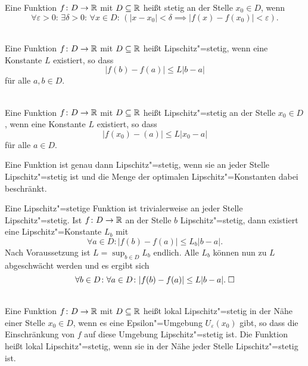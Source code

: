 \begin{Definition}\label{cont}
Eine Funktion $f\colon D\to\mathbb R$ mit $D\subseteq\mathbb R$ heißt stetig an der
Stelle $x_0\in D$, wenn
\[\forall \varepsilon{>}0\colon\,\exists \delta{>}0\colon\,\forall x{\in}D\colon\,
(|x-x_0|<\delta\implies |f(x)-f(x_0)|<\varepsilon).\]
\end{Definition}

\begin{Definition}\mbox{}\\
Eine Funktion $f\colon D\to\mathbb R$ mit $D\subseteq\mathbb R$ heißt
Lipschitz"=stetig, wenn eine Konstante $L$ existiert, so dass
\[|f(b)-f(a)|\le L|b-a|\]
für alle $a,b\in D$.
\end{Definition}

\begin{Definition}%
\label{Lipschitz-cont-at}\mbox{}\\
Eine Funktion $f\colon D\to\mathbb R$ mit $D\subseteq\mathbb R$ heißt
Lipschitz"=stetig an der Stelle $x_0\in D$, wenn eine Konstante $L$
existiert, so dass
\[|f(x_0)-(a)|\le L|x_0-a|\]
für alle $a\in D$.
\end{Definition}

\begin{Korollar}
Eine Funktion ist genau dann Lipschitz"=stetig, wenn sie an jeder
Stelle Lipschitz"=stetig ist und die Menge der optimalen
Lipschitz"=Konstanten dabei beschränkt.
\end{Korollar}
\begin{Beweis}
Eine Lipschitz"=stetige Funktion ist trivialerweise an jeder Stelle
Lipschitz"=stetig. Ist $f\colon D\to\mathbb R$ an der Stelle $b$ Lipschitz"=stetig,
dann existiert eine Lipschitz"=Konstante $L_b$ mit%
\[\forall a\in D\colon |f(b)-f(a)|\le L_b |b-a|.\]
Nach Voraussetzung ist $L=\sup_{b\in D} L_b$ endlich. Alle $L_b$ können
nun zu $L$ abgeschwächt werden und es ergibt sich%
\[\forall b\in D\colon\forall a\in D\colon |f(b)-f(a)|\le L|b-a|.\;\square\]
\end{Beweis}


\begin{Definition}\mbox{}\\
Eine Funktion $f\colon D\to\mathbb R$ mit $D\subseteq\mathbb R$ heißt lokal
Lipschitz"=stetig in der Nähe einer Stelle $x_0\in D$, wenn es eine
Epsilon"=Umgebung $U_\varepsilon(x_0)$ gibt, so dass die Einschränkung
von $f$ auf diese Umgebung Lipschitz"=stetig ist. Die Funktion heißt
lokal Lipschitz"=stetig, wenn sie in der Nähe jeder Stelle
Lipschitz"=stetig ist.
\end{Definition}

